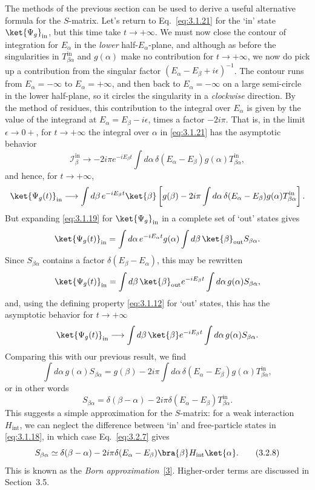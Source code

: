 The methods of the previous section can be used to derive a useful alternative
formula for the $S$-matrix. Let's return to Eq.~\eqref{eq:3.1.21} for the `in' state
$\ket{\Psi_g}_{\mathrm{in}}$, but this time take $t\to+\infty$. We must now
close the contour of integration for $E_\alpha$ in the \textit{lower}
half-$E_\alpha$-plane, and although as before the singularities in
$T^{\mathrm{in}}_{\beta\alpha}$ and $g(\alpha)$ make no contribution for
$t\to+\infty$, we now do pick up a contribution from the singular factor
$(E_\alpha-E_\beta+i\epsilon)^{-1}$. The contour runs from
$E_\alpha=-\infty$ to $E_\alpha=+\infty$, and then back to
$E_\alpha=-\infty$ on a large semi-circle in the lower half-plane, so it
circles the singularity in a \textit{clockwise} direction. By the method of
residues, this contribution to the integral over $E_\alpha$ is given by the
value of the integrand at $E_\alpha=E_\beta-i\epsilon$, times a factor
$-2i\pi$. That is, in the limit $\epsilon\to0+$, for $t\to+\infty$ the
integral over $\alpha$ in \eqref{eq:3.1.21} has the asymptotic behavior
\[
\mathcal I^{\mathrm{in}}_\beta\longrightarrow
-2i\pi e^{-iE_\beta t}
\int d\alpha\,\delta(E_\alpha-E_\beta)g(\alpha)
T^{\mathrm{in}}_{\beta\alpha},
\]
and hence, for $t\to+\infty$,
\[
\ket{\Psi_g(t)}_{\mathrm{in}}\longrightarrow
\int d\beta\,e^{-iE_\beta t}\ket{\beta}
\left[g(\beta)-2i\pi\int d\alpha\,
\delta(E_\alpha-E_\beta)g(\alpha)
T^{\mathrm{in}}_{\beta\alpha}\right].
\]
But expanding \eqref{eq:3.1.19} for $\ket{\Psi_g}_{\mathrm{in}}$ in a complete set of
`out' states gives
\[
\ket{\Psi_g(t)}_{\mathrm{in}}
=\int d\alpha\,e^{-iE_\alpha t}g(\alpha)
\int d\beta\,\ket{\beta}_{\mathrm{out}}S_{\beta\alpha}.
\]
Since $S_{\beta\alpha}$ contains a factor $\delta(E_\beta-E_\alpha)$, this
may be rewritten
\[
\ket{\Psi_g(t)}_{\mathrm{in}}
=\int d\beta\,\ket{\beta}_{\mathrm{out}}e^{-iE_\beta t}
\int d\alpha\,g(\alpha)S_{\beta\alpha},
\]
and, using the defining property \eqref{eq:3.1.12} for `out' states, this has the
asymptotic behavior for $t\to+\infty$
\[
\ket{\Psi_g(t)}_{\mathrm{in}}\longrightarrow
\int d\beta\,\ket{\beta}e^{-iE_\beta t}
\int d\alpha\,g(\alpha)S_{\beta\alpha}.
\]
Comparing this with our previous result, we find
\[
\int d\alpha\,g(\alpha)S_{\beta\alpha}
=g(\beta)-2i\pi\int d\alpha\,
\delta(E_\alpha-E_\beta)g(\alpha)T^{\mathrm{in}}_{\beta\alpha},
\]
or in other words
\begin{equation}
S_{\beta\alpha}=\delta(\beta-\alpha)
-2i\pi\delta(E_\alpha-E_\beta)T^{\mathrm{in}}_{\beta\alpha}.
\tag{3.2.7}\label{eq:3.2.7}
\end{equation}
This suggests a simple approximation for the $S$-matrix: for a weak
interaction $H_{\mathrm{int}}$, we can neglect the difference between `in'
and free-particle states in \eqref{eq:3.1.18}, in which case Eq.~\eqref{eq:3.2.7} gives
\begin{equation}
S_{\beta\alpha}\simeq\delta(\beta-\alpha)
-2i\pi\delta(E_\alpha-E_\beta)
\bra{\beta}H_{\mathrm{int}}\ket{\alpha}.
\tag{3.2.8}\label{eq:3.2.8}
\end{equation}
This is known as the \textit{Born approximation}~\hyperref[ref:3.3]{[3]}. Higher-order terms are
discussed in Section~3.5.

